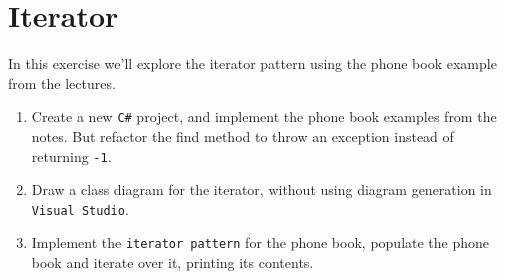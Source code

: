 \documentclass{article}
\newcounter{stepcounter}
\newenvironment{steps}{ 
  \begin{enumerate}[label=\color{red}Step \theenumi)]
    \setcounter{enumi}{\value{stepcounter}}
}{
  \setcounter{stepcounter}{\value{enumi}}
  \end{enumerate}
}
\begin{document}
\pagebreak
\section{Iterator}
In this exercise we'll explore the iterator pattern using the phone book example from the lectures.
\begin{steps}
  \item Create a new \texttt{C\#} project, and implement the phone book examples from the notes. But refactor the find method to throw an exception instead of returning \texttt{-1}.
  \item Draw a class diagram for the iterator, without using diagram generation in \texttt{Visual Studio}.
  \item Implement the \texttt{iterator pattern} for the phone book, populate the phone book and iterate over it, printing its contents.
\end{steps}
\end{document}
